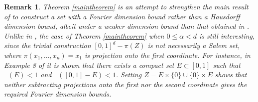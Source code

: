 \documentclass[12pt,reqno]{article}
\numberwithin{equation}{section}
\DeclareMathOperator{\minkdim}{\dim_{\mathbf{M}}}
\DeclareMathOperator{\fordim}{\dim_{\mathbf{F}}}
\newtheorem{remark}[theorem]{Remark}
\numberwithin{theorem}{section}
\begin{document}
\begin{remark}
    Theorem \ref{maintheorem} is an attempt to strengthen the main result of \cite{OurPaper} to construct a set with a Fourier dimension bound rather than a Hausdorff dimension bound, albeit under a weaker dimension bound than that obtained in \cite{OurPaper}. Unlike in \cite{OurPaper}, the case of Theorem \ref{maintheorem} when $0 \leq \alpha < d$ is still interesting, since the trivial construction $[0,1]^d - \pi(Z)$ is not necessarily a Salem set, where $\pi(x_1, \dots, x_n) = x_1$ is projection onto the first coordinate. For instance, in Example 8 of \cite{Ekstrom2014} it is shown that there exists a compact set $E \subset [0,1]$ such that $\minkdim(E) < 1$ and $\fordim([0,1] - E) < 1$. Setting $Z = E \times \{ 0 \} \cup \{ 0 \} \times E$ shows that neither subtracting projections onto the first nor the second coordinate gives the required Fourier dimension bounds.
\end{remark}
\end{document}
